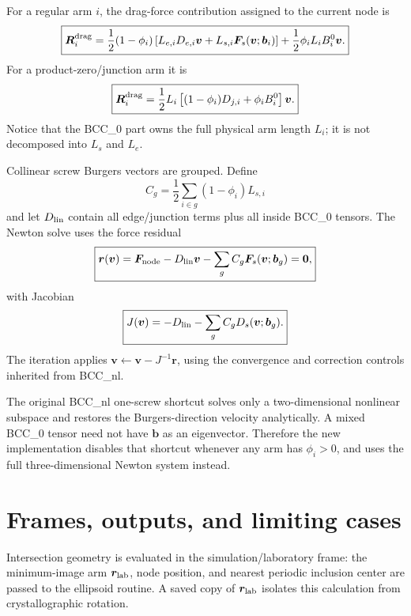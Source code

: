 \documentclass[11pt]{article}
\newcommand{\vect}[1]{\bm{#1}}
\begin{document}
For a regular arm \(i\), the drag-force contribution assigned to the current
node is
\begin{equation}
 \boxed{
 \vect{R}_i^{\rm drag}=
 \frac12(1-\phi_i)
 \left[L_{e,i}D_{e,i}\vect{v}
       +L_{s,i}\vect{F}_s(\vect{v};\vect{b}_i)\right]
 +\frac12\phi_iL_iB_i^0\vect{v}.}
 \label{eq:hybrid-regular}
\end{equation}
For a product-zero/junction arm it is
\begin{equation}
 \boxed{
 \vect{R}_i^{\rm drag}=
 \frac12L_i\left[(1-\phi_i)D_{j,i}+\phi_iB_i^0\right]\vect{v}.}
 \label{eq:hybrid-junction}
\end{equation}
Notice that the BCC\_0 part owns the full physical arm length \(L_i\); it is
not decomposed into \(L_s\) and \(L_e\).

Collinear screw Burgers vectors are grouped.  Define
\begin{equation}
 C_g=\frac12\sum_{i\in g}(1-\phi_i)L_{s,i}
 \label{eq:screw-group}
\end{equation}
and let \(D_{\rm lin}\) contain all edge/junction terms plus all inside
BCC\_0 tensors.  The Newton solve uses the force residual
\begin{equation}
 \boxed{
 \vect{r}(\vect{v})=\vect{F}_{\rm node}
 -D_{\rm lin}\vect{v}
 -\sum_g C_g\vect{F}_s(\vect{v};\vect{b}_g)=\vect{0},}
 \label{eq:residual}
\end{equation}
with Jacobian
\begin{equation}
 \boxed{
 J(\vect{v})=-D_{\rm lin}-\sum_g C_gD_s(\vect{v};\vect{b}_g).}
 \label{eq:jacobian}
\end{equation}
The iteration applies \(\vect{v}\leftarrow\vect{v}-J^{-1}\vect{r}\), using
the convergence and correction controls inherited from BCC\_nl.

The original BCC\_nl one-screw shortcut solves only a two-dimensional
nonlinear subspace and restores the Burgers-direction velocity analytically.
A mixed BCC\_0 tensor need not have \(\vect{b}\) as an eigenvector.  Therefore
the new implementation disables that shortcut whenever any arm has
\(\phi_i>0\), and uses the full three-dimensional Newton system instead.

\section{Frames, outputs, and limiting cases}
\label{sec:frames}

Intersection geometry is evaluated in the simulation/laboratory frame:
the minimum-image arm \(\vect{r}_{\rm lab}\), node position, and nearest
periodic inclusion center are passed to the ellipsoid routine.  A saved copy
of \(\vect{r}_{\rm lab}\) isolates this calculation from crystallographic
rotation.
\end{document}
